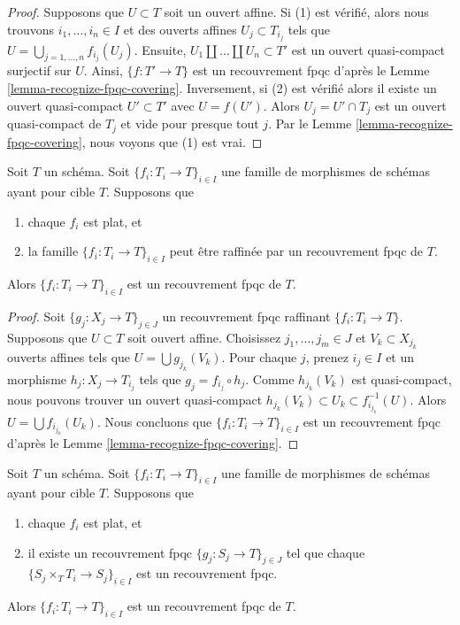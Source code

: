 \begin{proof}
Supposons que $U \subset T$ soit un ouvert affine. Si (1) est vérifié, alors nous trouvons $i_1, \ldots, i_n \in I$ et des ouverts affines $U_j \subset T_{i_j}$ tels que $U = \bigcup_{j = 1, \ldots, n} f_{i_j}(U_j)$. Ensuite, $U_1 \amalg \ldots \amalg U_n \subset T'$ est un ouvert quasi-compact surjectif sur $U$. Ainsi, $\{f : T' \to T\}$ est un recouvrement fpqc d'après le Lemme \ref{lemma-recognize-fpqc-covering}. Inversement, si (2) est vérifié alors il existe un ouvert quasi-compact $U' \subset T'$ avec $U = f(U')$. Alors $U_j = U' \cap T_j$ est un ouvert quasi-compact de $T_j$ et vide pour presque tout $j$. Par le Lemme \ref{lemma-recognize-fpqc-covering}, nous voyons que (1) est vrai.
\end{proof}

\begin{lemma}
\label{lemma-family-flat-dominated-covering}
Soit $T$ un schéma. Soit $\{f_i : T_i \to T\}_{i \in I}$ une famille de morphismes de schémas ayant pour cible $T$. Supposons que
\begin{enumerate}
\item chaque $f_i$ est plat, et
\item la famille $\{f_i : T_i \to T\}_{i \in I}$ peut être raffinée par un recouvrement fpqc de $T$.
\end{enumerate}
Alors $\{f_i : T_i \to T\}_{i \in I}$ est un recouvrement fpqc de $T$.
\end{lemma}

\begin{proof}
Soit $\{g_j : X_j \to T\}_{j \in J}$ un recouvrement fpqc raffinant $\{f_i : T_i \to T\}$. Supposons que $U \subset T$ soit ouvert affine. Choisissez $j_1, \ldots, j_m \in J$ et $V_k \subset X_{j_k}$ ouverts affines tels que $U = \bigcup g_{j_k}(V_k)$. Pour chaque $j$, prenez $i_j \in I$ et un morphisme $h_j : X_j \to T_{i_j}$ tels que $g_j = f_{i_j} \circ h_j$. Comme $h_{j_k}(V_k)$ est quasi-compact, nous pouvons trouver un ouvert quasi-compact $h_{j_k}(V_k) \subset U_k \subset f_{i_{j_k}}^{-1}(U)$. Alors $U = \bigcup f_{i_{j_k}}(U_k)$. Nous concluons que $\{f_i : T_i \to T\}_{i \in I}$ est un recouvrement fpqc d'après le Lemme \ref{lemma-recognize-fpqc-covering}.
\end{proof}

\begin{lemma}
\label{lemma-family-flat-fpqc-local-covering}
Soit $T$ un schéma. Soit $\{f_i : T_i \to T\}_{i \in I}$ une famille de morphismes de schémas ayant pour cible $T$. Supposons que
\begin{enumerate}
\item chaque $f_i$ est plat, et
\item il existe un recouvrement fpqc $\{g_j : S_j \to T\}_{j \in J}$ tel que chaque $\{S_j \times_T T_i \to S_j\}_{i \in I}$ est un recouvrement fpqc.
\end{enumerate}
Alors $\{f_i : T_i \to T\}_{i \in I}$ est un recouvrement fpqc de $T$.
\end{lemma}

